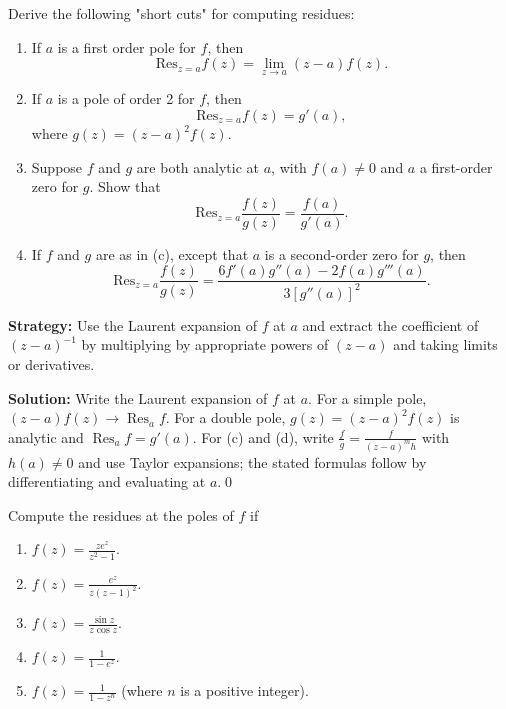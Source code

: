 \begin{problembox}
\begin{problemstatement}
Derive the following "short cuts" for computing residues:
\begin{enumerate}[label=(\alph*)]
\item If \( a \) is a first order pole for \( f \), then
\[ \text{Res}_{z=a} f(z) = \lim_{z \to a} (z - a) f(z). \]
\item If \( a \) is a pole of order 2 for \( f \), then
\[ \text{Res}_{z=a} f(z) = g'(a), \]
where \( g(z) = (z - a)^2 f(z) \).
\item Suppose \( f \) and \( g \) are both analytic at \( a \), with \( f(a) \neq 0 \) and \( a \) a first-order zero for \( g \). Show that
\[ \text{Res}_{z=a} \frac{f(z)}{g(z)} = \frac{f(a)}{g'(a)}. \]
\item If \( f \) and \( g \) are as in (c), except that \( a \) is a second-order zero for \( g \), then
\[ \text{Res}_{z=a} \frac{f(z)}{g(z)} = \frac{6 f'(a) g''(a) - 2 f(a) g'''(a)}{3 [g''(a)]^2}. \]
\end{enumerate}
\end{problemstatement}
\end{problembox}

\noindent\textbf{Strategy:} Use the Laurent expansion of \( f \) at \( a \) and extract the coefficient of \( (z-a)^{-1} \) by multiplying by appropriate powers of \( (z-a) \) and taking limits or derivatives.

\bigskip\noindent\textbf{Solution:}
Write the Laurent expansion of $f$ at $a$. For a simple pole, $(z-a)f(z)\to\operatorname{Res}_a f$. For a double pole, $g(z)=(z-a)^2 f(z)$ is analytic and $\operatorname{Res}_a f=g'(a)$. For (c) and (d), write $\frac{f}{g}=\frac{f}{(z-a)^m h}$ with $h(a)\ne0$ and use Taylor expansions; the stated formulas follow by differentiating and evaluating at $a$.\qed


\begin{problembox}
\begin{problemstatement}
Compute the residues at the poles of \( f \) if
\begin{enumerate}[label=(\alph*)]
\item \( f(z) = \frac{ze^z}{z^2 - 1} \).
\item \( f(z) = \frac{e^z}{z(z - 1)^2} \).
\item \( f(z) = \frac{\sin z}{z \cos z} \).
\item \( f(z) = \frac{1}{1 - e^z} \).
\item \( f(z) = \frac{1}{1 - z^n} \) (where \( n \) is a positive integer).
\end{enumerate}
\end{problemstatement}
\end{problembox}

